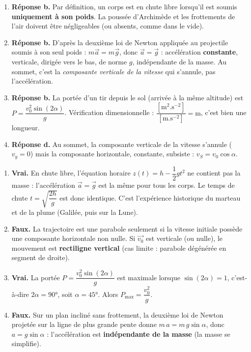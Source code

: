 \documentclass[11pt]{article}
\newcommand{\cle}[1]{{\popxbold\color{popdark}#1}}
\begin{document}
\begin{corrige}
\begin{enumerate}
\item \textbf{Réponse b.} Par définition, un corps est en \cle{chute libre} lorsqu'il est soumis \textbf{uniquement à son poids}. La poussée d'Archimède et les frottements de l'air doivent être négligeables (ou absents, comme dans le vide).
\item \textbf{Réponse b.} D'après la deuxième loi de Newton appliquée au projectile soumis à son seul poids : $m\vec{a} = m\vec{g}$, donc $\vec{a} = \vec{g}$ : accélération \textbf{constante}, verticale, dirigée vers le bas, de norme $g$, indépendante de la masse. Au sommet, c'est la \emph{composante verticale de la vitesse} qui s'annule, pas l'accélération.
\item \textbf{Réponse b.} La portée d'un tir depuis le sol (arrivée à la même altitude) est $P = \dfrac{v_0^2\sin(2\alpha)}{g}$. Vérification dimensionnelle : $\dfrac{[\mathrm{m}^2.\mathrm{s}^{-2}]}{[\mathrm{m}.\mathrm{s}^{-2}]} = \mathrm{m}$, c'est bien une longueur.
\item \textbf{Réponse d.} Au sommet, la composante verticale de la vitesse s'annule ($v_y = 0$) mais la composante horizontale, constante, subsiste : $v_S = v_0\cos\alpha$.
\end{enumerate}
\end{corrige}

\begin{corrige}
\begin{enumerate}
\item \textbf{Vrai.} En chute libre, l'équation horaire $z(t) = h - \dfrac{1}{2}gt^2$ ne contient pas la masse : l'accélération $\vec{a} = \vec{g}$ est la même pour tous les corps. Le temps de chute $t = \sqrt{\dfrac{2h}{g}}$ est donc identique. C'est l'expérience historique du marteau et de la plume (Galilée, puis sur la Lune).
\item \textbf{Faux.} La trajectoire est une parabole seulement si la vitesse initiale possède une composante horizontale non nulle. Si $\vec{v_0}$ est verticale (ou nulle), le mouvement est \textbf{rectiligne vertical} (cas limite : parabole dégénérée en segment de droite).
\item \textbf{Vrai.} La portée $P = \dfrac{v_0^2\sin(2\alpha)}{g}$ est maximale lorsque $\sin(2\alpha) = 1$, c'est-à-dire $2\alpha = 90°$, soit $\alpha = 45°$. Alors $P_{\max} = \dfrac{v_0^2}{g}$.
\item \textbf{Faux.} Sur un plan incliné sans frottement, la deuxième loi de Newton projetée sur la ligne de plus grande pente donne $m\,a = m\,g\sin\alpha$, donc $a = g\sin\alpha$ : l'accélération est \textbf{indépendante de la masse} (la masse se simplifie).
\end{enumerate}
\end{corrige}
\end{document}
